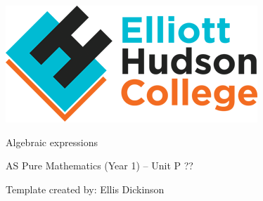 \documentclass[fleqn]{article}
\newcommand\getcurrentref[1]{%
 \ifnumequal{\value{#1}}{0}
  {??}
  {\the\value{#1}}%
}
\newcommand\YUGE{\fontsize{35}{35}\selectfont}
\newcommand{\coursetitle}{AS Pure Mathematics (Year 1)}				%
\newcommand{\bookletunittitle}{Algebraic expressions}				%
\newcommand{\bookletsubtitle}{{\rmfamily\LaTeX} Template created by: Ellis Dickinson}	%
\newcommand{\formattedunittitle}{Unit P\getcurrentref{section}} 		%
\begin{document}
\vspace{-0.5cm}
\includegraphics[scale=0.35]{images/ehc-logo-retina}

\vspace{8.5cm}
\begin{minipage}{\textwidth}
	\sffamily 			

	\vspace{2mm}
	{\YUGE \raggedleft\bookletunittitle\\}

	\vspace{1mm}	
	{\huge \raggedleft\coursetitle { }-- \formattedunittitle\\}
	
	\vspace{2mm}
	{\small \raggedleft\bookletsubtitle\\}	
\end{minipage}
\end{document}
